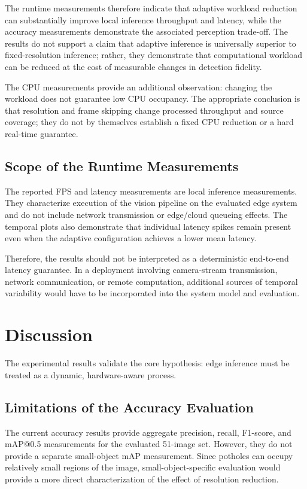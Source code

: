 \documentclass{ieeeaccess}
\begin{document}
The runtime measurements therefore indicate that adaptive workload
reduction can substantially improve local inference throughput and latency,
while the accuracy measurements demonstrate the associated perception
trade-off. The results do not support a claim that adaptive inference is
universally superior to fixed-resolution inference; rather, they demonstrate
that computational workload can be reduced at the cost of measurable changes
in detection fidelity.

The CPU measurements provide an additional observation: changing the
workload does not guarantee low CPU occupancy. The appropriate conclusion is
that resolution and frame skipping change processed throughput and source
coverage; they do not by themselves establish a fixed CPU reduction or a
hard real-time guarantee.


\subsection{Scope of the Runtime Measurements}

The reported FPS and latency measurements are local inference measurements.
They characterize execution of the vision pipeline on the evaluated edge
system and do not include network transmission or edge/cloud queueing
effects. The temporal plots also demonstrate that individual latency spikes
remain present even when the adaptive configuration achieves a lower mean
latency.

Therefore, the results should not be interpreted as a deterministic
end-to-end latency guarantee. In a deployment involving camera-stream
transmission, network communication, or remote computation, additional
sources of temporal variability would have to be incorporated into the
system model and evaluation.

\section{Discussion}
\label{sec:discussion}
The experimental results validate the core hypothesis: edge inference must be treated as a dynamic, hardware-aware process. 

\subsection{Limitations of the Accuracy Evaluation}

The current accuracy results provide aggregate precision, recall, F1-score,
and mAP@0.5 measurements for the evaluated 51-image set. However, they do
not provide a separate small-object mAP measurement. Since potholes can
occupy relatively small regions of the image, small-object-specific
evaluation would provide a more direct characterization of the effect of
resolution reduction.
\end{document}
